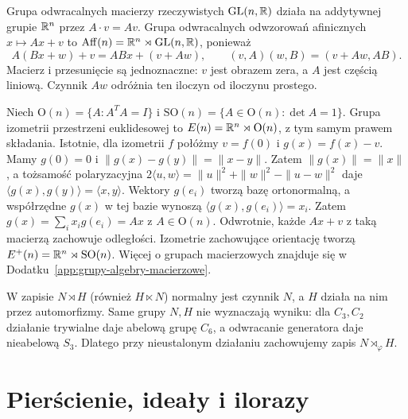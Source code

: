 \begin{przyklad}
Grupa odwracalnych macierzy rzeczywistych $\mathrm{GL}(n,\mathbb{R})$
działa na addytywnej grupie $\mathbb{R}^n$ przez $A\cdot v=Av$.
Grupa odwracalnych odwzorowań afinicznych $x\mapsto Ax+v$ to
$\operatorname{Aff}(n)=\mathbb{R}^n\rtimes\mathrm{GL}(n,\mathbb{R})$, ponieważ
\[
 A(Bx+w)+v=ABx+(v+Aw),\qquad
 (v,A)(w,B)=(v+Aw,AB).
\]
Macierz i przesunięcie są jednoznaczne: $v$ jest obrazem zera,
a $A$ jest częścią liniową. Czynnik $Aw$ odróżnia ten iloczyn
od iloczynu prostego.
\end{przyklad}

\begin{przyklad}
Niech $\mathrm O(n)=\{A:A^TA=I\}$ i
$\mathrm{SO}(n)=\{A\in\mathrm O(n):\det A=1\}$.
Grupa izometrii przestrzeni euklidesowej to
$E(n)=\mathbb{R}^n\rtimes\mathrm O(n)$, z tym samym prawem składania.
Istotnie, dla izometrii $f$ połóżmy $v=f(0)$ i $g(x)=f(x)-v$.
Mamy $g(0)=0$ i $\|g(x)-g(y)\|=\|x-y\|$. Zatem
$\|g(x)\|=\|x\|$, a tożsamość polaryzacyjna
$2\langle u,w\rangle=\|u\|^2+\|w\|^2-\|u-w\|^2$ daje
$\langle g(x),g(y)\rangle=\langle x,y\rangle$.
Wektory $g(e_i)$ tworzą bazę ortonormalną, a współrzędne $g(x)$
w tej bazie wynoszą $\langle g(x),g(e_i)\rangle=x_i$.
Zatem $g(x)=\sum_i x_i g(e_i)=Ax$ z $A\in\mathrm O(n)$.
Odwrotnie, każde $Ax+v$ z taką macierzą zachowuje odległości.
Izometrie zachowujące orientację tworzą
$E^+(n)=\mathbb{R}^n\rtimes\mathrm{SO}(n)$.
Więcej o grupach macierzowych znajduje się w
Dodatku~\ref{app:grupy-algebry-macierzowe}.
\end{przyklad}

\begin{uwaga}
W zapisie $N\rtimes H$ (również $H\ltimes N$) normalny jest czynnik
$N$, a $H$ działa na nim przez automorfizmy. Same grupy $N,H$ nie
wyznaczają wyniku: dla $C_3,C_2$ działanie trywialne daje abelową
grupę $C_6$, a odwracanie generatora daje nieabelową $S_3$.
Dlatego przy nieustalonym działaniu zachowujemy zapis $N\rtimes_\varphi H$.
\end{uwaga}


\section{Pierścienie, ideały i ilorazy}
\label{sec:pierscienie-idealy}

